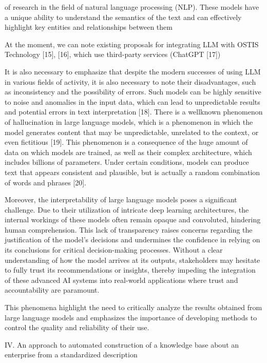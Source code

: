 \documentclass [11pt,a4paper]{article}
\begin{document}
\begin{multicols}{2}
of research in the field of natural language processing
(NLP). These models have a unique ability to understand
the semantics of the text and can effectively highlight key
entities and relationships between them \par
At the moment, we can note existing proposals for
integrating LLM with OSTIS Technology [15], [16],
which use third-party services (ChatGPT [17]) \par It is also necessary to emphasize that despite the modern successes of using LLM in various fields of activity,
it is also necessary to note their disadvantages, such as
inconsistency and the possibility of errors. Such models
can be highly sensitive to noise and anomalies in the
input data, which can lead to unpredictable results and
potential errors in text interpretation [18]. There is a wellknown phenomenon of hallucination in large language
models, which is a phenomenon in which the model
generates content that may be unpredictable, unrelated to
the context, or even fictitious [19]. This phenomenon is a consequence of the huge amount of data on which models
are trained, as well as their complex architecture, which
includes billions of parameters. Under certain conditions,
models can produce text that appears consistent and
plausible, but is actually a random combination of words
and phrases [20].
\par Moreover, the interpretability of large language models
poses a significant challenge. Due to their utilization of
intricate deep learning architectures, the internal workings of these models often remain opaque and convoluted, hindering human comprehension. This lack of
transparency raises concerns regarding the justification
of the model’s decisions and undermines the confidence
in relying on its conclusions for critical decision-making
processes. Without a clear understanding of how the
model arrives at its outputs, stakeholders may hesitate
to fully trust its recommendations or insights, thereby
impeding the integration of these advanced AI systems
into real-world applications where trust and accountability are paramount.
\par This phenomena highlight the need to critically analyze the results obtained from large language models
and emphasizes the importance of developing methods
to control the quality and reliability of their use.
\begin{center}
    IV. An approach to automated construction of a
knowledge base about an enterprise from a standardized
description
\end{center}

\end{multicols}
\end{document}
